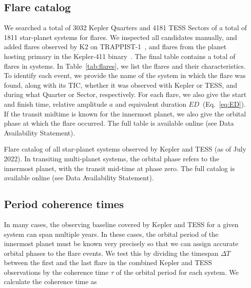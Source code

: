 \documentclass[twocolumn]{aastex631}
\begin{document}
\subsection{Flare catalog}
\label{sec:results:catalog}
We searched a total of 3032 Kepler Quarters and 4181 TESS Sectors of a total of 1811 star-planet systems for flares. We inspected all candidates manually, and added flares observed by K2 on TRAPPIST-1~\citep{paudel2018k2}, and flares from the planet hosting primary in the Kepler-411 binary~\citep{jackman2021stellara}. The final table contains a total of flares in systems. In Table~\ref{tab:flares}, we list the flares and their characteristics. To identify each event, we provide the name of the system in which the flare was found, along with its TIC, whether it was observed with Kepler or TESS, and during what Quarter or Sector, respectively. For each flare, we also give the start and finish time, relative amplitude $a$ and equivalent duration $ED$~(Eq.~\ref{eq:ED}). If the transit midtime is known for the innermost planet, we also give the orbital phase at which the flare occurred. The full table is available online (see Data Availability Statement).

\begin{table*}
    \centering
            \caption{
            Flare catalog of all star-planet systems observed by Kepler and TESS (as of July 2022). In transiting multi-planet systems, the orbital phase refers to the innermost planet, with the transit mid-time at phase zero. The full catalog is available online (see Data Availability Statement).
        }
    
        \label{tab:flares}
\end{table*}

\subsection{Period coherence times}
\label{sec:results:coherence}
In many cases, the observing baseline covered by Kepler and TESS for a given system can span multiple years. In these cases, the orbital period of the innermost planet must be known very precisely so that we can assign accurate orbital phases to the flare events.
We test this by dividing the timespan $\Delta T$ between the first and the last flare in the combined Kepler and TESS observations by the coherence time $\tau$ of the orbital period for each system. We calculate the coherence time as
\end{document}
